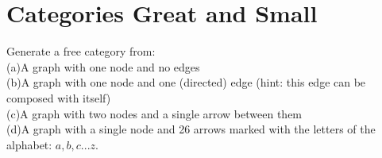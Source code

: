 \documentclass[7x10,thmnumcontwithchapter,WebLink,AddlevelTwoTOC,NumRef,BookEndNote,printer]{pupbook}
\begin{document}
\chapter[Categories Great and Small]{Categories Great and Small\thefootnote}

\begin{exercise}
Generate a free category from: \\
(a)A graph with one node and no edges \\
(b)A graph with one node and one (directed) edge (hint: this
edge can be composed with itself)\\
(c)A graph with two nodes and a single arrow between them \\
(d)A graph with a single node and 26 arrows marked with the letters of the alphabet: $a, b, c ... z$.
\end{exercise}
\end{document}
